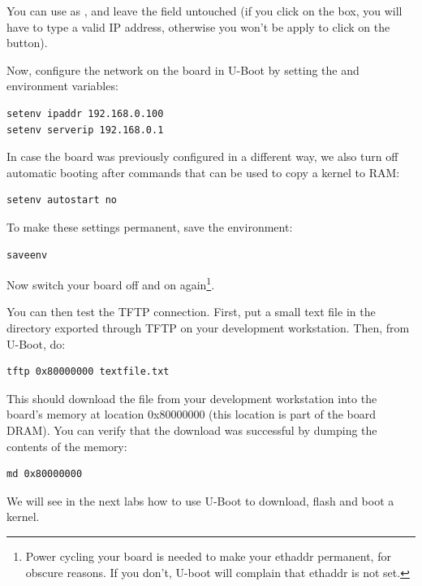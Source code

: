 You can use  as , and leave the
 field untouched (if you click on the  box, you
will have to type a valid IP address, otherwise you won't be apply to
click on the  button).

Now, configure the network on the board in U-Boot by setting the 
and  environment variables:

\begin{verbatim}
setenv ipaddr 192.168.0.100
setenv serverip 192.168.0.1
\end{verbatim}

In case the board was previously configured in a different way, we
also turn off automatic booting after commands that can be used to
copy a kernel to RAM:

\begin{verbatim}
setenv autostart no
\end{verbatim}

To make these settings permanent, save the environment:

\begin{verbatim}
saveenv
\end{verbatim}

Now switch your board off and on again\footnote{Power cycling your
  board is needed to make your ethaddr permanent, for obscure
  reasons. If you don't, U-boot will complain that ethaddr is not
  set.}.

You can then test the TFTP connection. First, put a small text file in
the directory exported through TFTP on your development
workstation. Then, from U-Boot, do:

\begin{verbatim}
tftp 0x80000000 textfile.txt
\end{verbatim}

This should download the file  from your development
workstation into the board's memory at location 0x80000000 (this
location is part of the board DRAM). You can verify that the download
was successful by dumping the contents of the memory:

\begin{verbatim}
md 0x80000000
\end{verbatim}

We will see in the next labs how to use U-Boot to download, flash and
boot a kernel.
